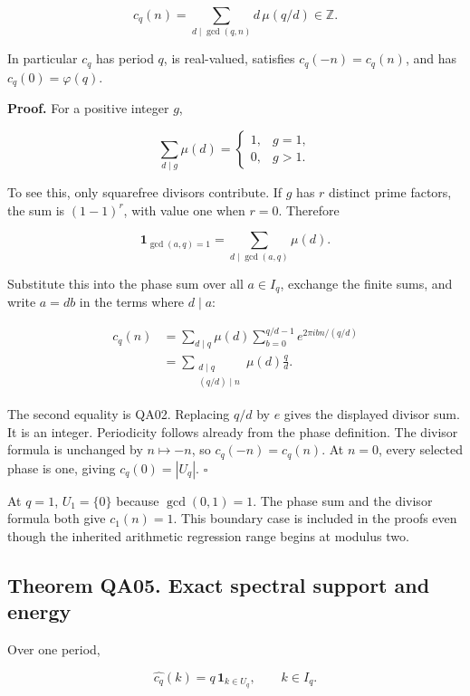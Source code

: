 \[
\boxed{c_q(n)=\sum_{d\mid\gcd(q,n)}d\,\mu(q/d)\in\mathbb Z.}
\]

In particular \(c_q\) has period \(q\), is real-valued, satisfies
\(c_q(-n)=c_q(n)\), and has \(c_q(0)=\varphi(q)\).

\textbf{Proof.} For a positive integer \(g\),

\[
\sum_{d\mid g}\mu(d)
=\begin{cases}1,&g=1,\\0,&g>1.\end{cases}
\]

To see this, only squarefree divisors contribute. If \(g\) has \(r\)
distinct prime factors, the sum is \((1-1)^r\), with value one when
\(r=0\). Therefore

\[
\mathbf1_{\gcd(a,q)=1}=\sum_{d\mid\gcd(a,q)}\mu(d).
\]

Substitute this into the phase sum over all \(a\in I_q\), exchange the
finite sums, and write \(a=db\) in the terms where \(d\mid a\):

\[
\begin{aligned}
c_q(n)
&=\sum_{d\mid q}\mu(d)
  \sum_{b=0}^{q/d-1}e^{2\pi ibn/(q/d)}\\
&=\sum_{\substack{d\mid q\\(q/d)\mid n}}\mu(d)\frac qd.
\end{aligned}
\]

The second equality is QA02. Replacing \(q/d\) by \(e\) gives the
displayed divisor sum. It is an integer. Periodicity follows already
from the phase definition. The divisor formula is unchanged by
\(n\mapsto -n\), so \(c_q(-n)=c_q(n)\). At \(n=0\), every selected phase
is one, giving \(c_q(0)=|U_q|\). \(\square\)

At \(q=1\), \(U_1=\{0\}\) because \(\gcd(0,1)=1\). The phase sum and the
divisor formula both give \(c_1(n)=1\). This boundary case is included
in the proofs even though the inherited arithmetic regression range
begins at modulus two.

\hypertarget{q:theorem-qa05.-exact-spectral-support-and-energy}{%
\subsection*{Theorem QA05. Exact spectral support and
energy}\label{q:theorem-qa05.-exact-spectral-support-and-energy}}

Over one period,

\[
\boxed{\widehat{c_q}(k)=q\,\mathbf1_{k\in U_q},\qquad k\in I_q.}
\]


